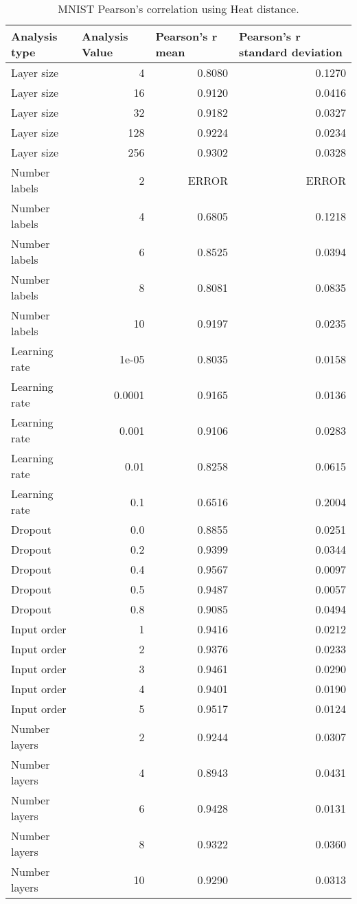\documentclass{article}
\begin{document}
\begin{table}[H]
\centering
\begin{tabular}{@{}lrrr@{}}
\toprule
Analysis type & \multicolumn{1}{l}{Analysis Value} & \multicolumn{1}{l}{Pearson's r mean} & \multicolumn{1}{l}{Pearson's r standard deviation} \\ \midrule
Layer size & 4 & 0.8080 & 0.1270 \\ 
Layer size & 16 & 0.9120 & 0.0416 \\ 
Layer size & 32 & 0.9182 & 0.0327 \\ 
Layer size & 128 & 0.9224 & 0.0234 \\ 
Layer size & 256 & 0.9302 & 0.0328 \\ 
Number labels & 2 & ERROR & ERROR \\ 
Number labels & 4 & 0.6805 & 0.1218 \\ 
Number labels & 6 & 0.8525 & 0.0394 \\ 
Number labels & 8 & 0.8081 & 0.0835 \\ 
Number labels & 10 & 0.9197 & 0.0235 \\ 
Learning rate & 1e-05 & 0.8035 & 0.0158 \\ 
Learning rate & 0.0001 & 0.9165 & 0.0136 \\ 
Learning rate & 0.001 & 0.9106 & 0.0283 \\ 
Learning rate & 0.01 & 0.8258 & 0.0615 \\ 
Learning rate & 0.1 & 0.6516 & 0.2004 \\ 
Dropout & 0.0 & 0.8855 & 0.0251 \\ 
Dropout & 0.2 & 0.9399 & 0.0344 \\ 
Dropout & 0.4 & 0.9567 & 0.0097 \\ 
Dropout & 0.5 & 0.9487 & 0.0057 \\ 
Dropout & 0.8 & 0.9085 & 0.0494 \\ 
Input order & 1 & 0.9416 & 0.0212 \\ 
Input order & 2 & 0.9376 & 0.0233 \\ 
Input order & 3 & 0.9461 & 0.0290 \\ 
Input order & 4 & 0.9401 & 0.0190 \\ 
Input order & 5 & 0.9517 & 0.0124 \\ 
Number layers & 2 & 0.9244 & 0.0307 \\ 
Number layers & 4 & 0.8943 & 0.0431 \\ 
Number layers & 6 & 0.9428 & 0.0131 \\ 
Number layers & 8 & 0.9322 & 0.0360 \\ 
Number layers & 10 & 0.9290 & 0.0313 \\ 
\bottomrule
\end{tabular}
\caption{MNIST Pearson's correlation using Heat distance.}
\end{table}
\end{document}
